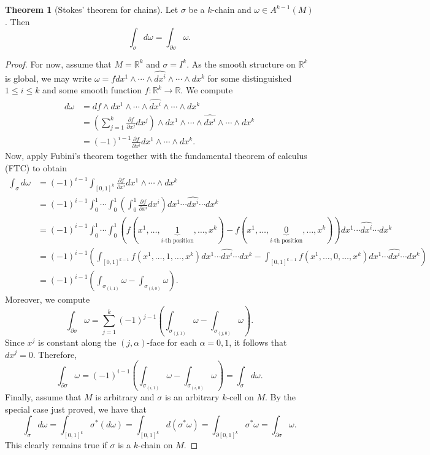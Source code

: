 \documentclass[10pt,letterpaper,cm]{nupset}
\theoremstyle{definition}
\theoremstyle{theorem}
\newtheorem{theorem}[definition]{Theorem}
\theoremstyle{remark}
\newcommand{\R}{\mathbb R}
\newcommand{\1}{\mathbf{1}}
\newcommand{\0}{\vec 0}
\begin{document}
\begin{theorem}[Stokes' theorem for chains]\label{chains}
Let $\sigma$ be a $k$-chain and $\omega \in A^{k-1}(M)$. Then $$\int_{\sigma} d\omega = \int_{\partial{\sigma}} \omega.$$
\end{theorem}
\begin{proof}
For now, assume that $M= \R^k$ and $\sigma = I^k$. As the smooth structure on $\R^k$ is global, we may write $\omega = fdx^1 \wedge \cdots \wedge \widehat{dx^i} \wedge \cdots \wedge dx^k$ for some distinguished $1\leq i \leq k$ and some smooth function $f: \R^k \to \R$. We compute 
\begin{align*}
 d\omega & = df \wedge dx^1 \wedge \cdots \wedge \widehat{dx^i} \wedge \cdots \wedge dx^k
\\ & = \left(\sum_{j=1}^k\frac{\partial{f}}{\partial{x^j}}dx^j \right)\wedge dx^1 \wedge \cdots \wedge \widehat{dx^i} \wedge \cdots \wedge dx^k
\\ & = ({-1})^{i-1} \frac{\partial{f}}{\partial{x^i}}dx^1 \wedge \cdots \wedge dx^k.
\end{align*}
Now, apply Fubini's theorem  together with the fundamental theorem of calculus (FTC) to obtain
\begin{align*}
 \int_{\sigma}d\omega & = ({-1})^{i-1}\int_{\left[0,1\right]^k} \frac{\partial{f}}{\partial{x^i}}dx^1 \wedge \cdots \wedge dx^k
\\ & = ({-1})^{i-1}\int_0^1 \cdots \int_0^1 \left(\int_0^1  \frac{\partial{f}}{\partial{x^i}}dx^i \right)dx^1 \cdots \widehat{dx^i}  \cdots dx^k
\\ & = ({-1})^{i-1}\int_0^1 \cdots \int_0^1(f(x^1, \ldots, \underbrace{1}_{i\text{-th position}}, \ldots, x^k) - f(x^1, \ldots, \underbrace{0}_{i\text{-th position}}, \ldots, x^k))dx^1 \cdots \widehat{dx^i}  \cdots dx^k
\\ & =  ({-1})^{i-1}\left( \int_{\left[0,1\right]^{k-1}} f(x^1, \ldots, 1, \ldots, x^k)dx^1 \cdots \widehat{dx^i}  \cdots dx^k -\int_{\left[0,1\right]^{k-1}}f(x^1, \ldots, 0, \ldots, x^k)dx^1 \cdots \widehat{dx^i}  \cdots dx^k \right)
\\ & = ({-1})^{i-1}\left(\int_{\sigma_{(i, 1)}}\omega - \int_{\sigma_{(i, 0)}}\omega \right) .
\end{align*}
Moreover, we compute
$$ \int_{\partial{\sigma}}\omega = \sum_{j=1}^k({-1})^{j-1}\left(\int_{\sigma_{(j, 1)}}\omega - \int_{\sigma_{(j, 0)}}\omega \right).$$
Since $x^j$ is constant along the $(j, \alpha)$-face for each $\alpha = 0, 1$, it follows that $dx^j = 0$. Therefore, $$ \int_{\partial{\sigma}}\omega =   ({-1})^{i-1}\left(\int_{\sigma_{(i, 1)}}\omega - \int_{\sigma_{(i, 0)}}\omega \right) = \int_{\sigma} d\omega.$$
Finally, assume that $M$ is arbitrary and $\sigma $ is an arbitrary $k$-cell on $M$. By the special case just proved, we have that
$$  \int_{\sigma}d\omega = \int_{\left[0,1\right]^k}\sigma^{\ast}(d\omega) = \int_{\left[0,1\right]^k}d(\sigma^{\ast}\omega) = \int_{\partial{\left[0,1\right]^k}}\sigma^{\ast} \omega = \int_{\partial{\sigma}} \omega .$$
This clearly remains true if $\sigma$ is a $k$-chain on $M$.
\end{proof}
\end{document}
